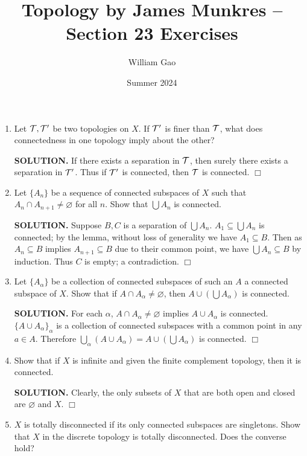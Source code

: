\documentclass{article}
\title{Topology by James Munkres -- Section 23 Exercises}
\author{William Gao}
\date{Summer 2024}
\begin{document}
\maketitle

\begin{enumerate}
    \item Let $\mathcal{T}, \mathcal{T}'$ be two topologies on $X$. If $\mathcal{T}'$ is finer than $\mathcal{T}$, what does connectedness in one topology imply about the other?

    {\bf SOLUTION.} If there exists a separation in $\mathcal{T}$, then surely there exists a separation in $\mathcal{T}'$. Thus if $\mathcal{T}'$ is connected, then $\mathcal{T}$ is connected. $\Box$

    \item Let $\{A_n\}$ be a sequence of connected subspaces of $X$ such that $A_n \cap A_{n+1} \neq \varnothing$ for all $n.$ Show that $\bigcup A_n$ is connected.
    
    {\bf SOLUTION.} Suppose $B, C$ is a separation of $\bigcup A_n$. $A_1 \subseteq \bigcup A_n$ is connected; by the lemma, without loss of generality we have $A_1 \subseteq B$. Then as $A_n \subseteq B$ implies $A_{n+1} \subseteq B$ due to their common point, we have $\bigcup A_n \subseteq B$ by induction. Thus $C$ is empty; a contradiction. $\Box$

    \item Let $\{A_\alpha\}$ be a collection of connected subspaces of such an $A$ a connected subspace of $X$. Show that if $A \cap A_\alpha \neq \varnothing$, then $A \cup (\bigcup A_\alpha)$ is connected.
    
    {\bf SOLUTION.} For each $\alpha$, $A \cap A_\alpha \neq \varnothing$ implies $A \cup A_\alpha$ is connected. $\{A \cup A_\alpha\}_\alpha$ is a collection of connected subspaces with a common point in any $a \in A$. Therefore $\bigcup_\alpha (A \cup A_\alpha) = A \cup (\bigcup A_\alpha)$ is connected. $\Box$

    \item Show that if $X$ is infinite and given the finite complement topology, then it is connected.

    {\bf SOLUTION.} Clearly, the only subsets of $X$ that are both open and closed are $\varnothing$ and $X.$ $\Box$

    \item $X$ is totally disconnected if its only connected subspaces are singletons. Show that $X$ in the discrete topology is totally disconnected. Does the converse hold?


\end{enumerate}
\end{document}

